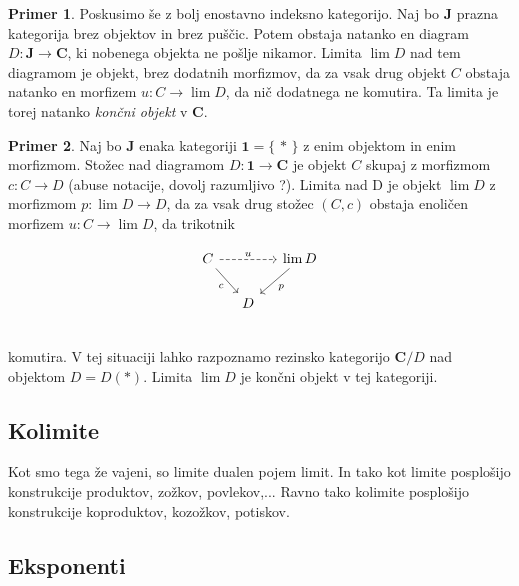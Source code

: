 \documentclass[12pt,a4paper]{book}
\theoremstyle{definition}
\theoremstyle{plain}
\theoremstyle{definition}
\newtheorem{primer}{Primer}[section]
\theoremstyle{remark}
\newcommand{\cat}[1]{\textbf{#1}}
\renewcommand{\set}[1]{\{\,#1\,\}}
\begin{document}
\begin{primer}
Poskusimo še z bolj enostavno indeksno kategorijo. Naj bo $\cat{J}$ prazna kategorija brez objektov in brez puščic. Potem obstaja natanko en diagram $D : \cat{J} \to \cat{C}$, ki nobenega objekta ne pošlje nikamor. Limita $\lim D$ nad tem diagramom je objekt, brez dodatnih morfizmov, da za vsak drug objekt $C$ obstaja natanko en morfizem $u : C \to \lim D$, da nič dodatnega ne komutira. Ta limita je torej natanko \textit{končni objekt} v $\cat{C}$.
\end{primer}

\begin{primer}
Naj bo $\cat{J}$ enaka kategoriji $\cat{1} = \set{\ast}$ z enim objektom in enim morfizmom. Stožec nad diagramom $D : \cat{1} \to \cat{C}$ je objekt $C$ skupaj z morfizmom $c : C \to D$ (abuse notacije, dovolj razumljivo ?). Limita nad D je objekt $\lim D$ z morfizmom $p : \lim D \to D$, da za vsak drug stožec $(C, c)$ obstaja enoličen morfizem $u : C \to \lim D$, da trikotnik

$$\begin{tikzcd}[column sep=small]
C \ar[dr, "c"'] \ar[rr, dashed, "u"] & & \lim D \ar[dl, "p"] \\
& D & \\
\end{tikzcd}$$
komutira. V tej situaciji lahko razpoznamo rezinsko kategorijo $\cat{C}/D$ nad objektom $D = D(\ast)$. Limita $\lim D$ je končni objekt v tej kategoriji.
\end{primer}



\subsection{Kolimite}
Kot smo tega že vajeni, so limite dualen pojem limit. In tako kot limite posplošijo konstrukcije produktov, zožkov, povlekov,... Ravno tako kolimite posplošijo konstrukcije koproduktov, kozožkov, potiskov.



\subsection{Eksponenti}
\end{document}
